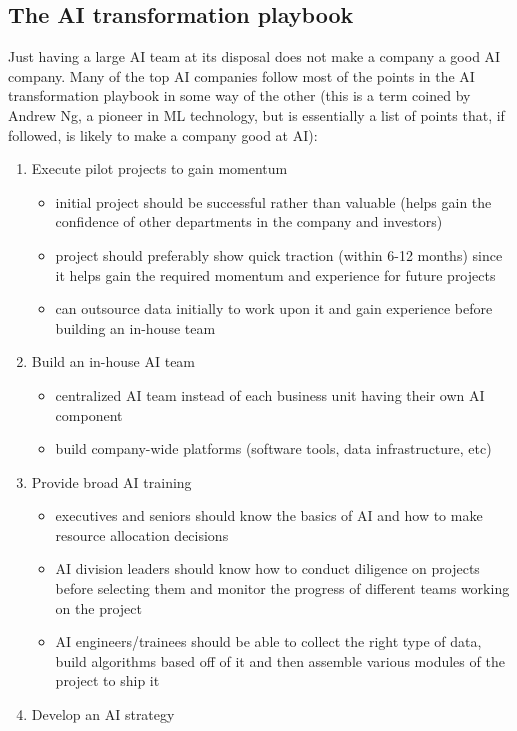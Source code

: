 \documentclass{article}[a4paper,12pt]
\theoremstyle{definition}
\begin{document}
\subsection{The AI transformation playbook}
Just having a large AI team at its disposal does not make a company a good AI company. Many of the top AI companies follow most of the points in the AI transformation playbook in some way of the other (this is a term coined by Andrew Ng, a pioneer in ML technology, but is essentially a list of points that, if followed, is likely to make a company good at AI):
\begin{enumerate}
	\item Execute pilot projects to gain momentum
	\begin{itemize}
		\item initial project should be successful rather than valuable (helps gain the confidence of other departments in the company and investors)
		\item project should preferably show quick traction (within 6-12 months) since it helps gain the required momentum and experience for future projects
		\item can outsource data initially to work upon it and gain experience before building an in-house team
	\end{itemize}
	\item Build an in-house AI team
	\begin{itemize}
		\item centralized AI team instead of each business unit having their own AI component
		\item build company-wide platforms (software tools, data infrastructure, etc)
	\end{itemize}
	\item Provide broad AI training
	\begin{itemize}
		\item executives and seniors should know the basics of AI and how to make resource allocation decisions
		\item AI division leaders should know how to conduct diligence on projects before selecting them and monitor the progress of different teams working on the project
		\item AI engineers/trainees should be able to collect the right type of data, build algorithms based off of it and then assemble various modules of the project to ship it 
	\end{itemize}
	\item Develop an AI strategy
	\begin{itemize}

\end{itemize}
\end{enumerate}
\end{document}
